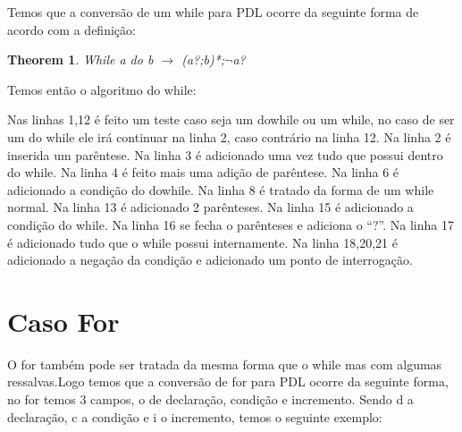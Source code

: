 \documentclass{article}
\newtheorem{theorem}{Theorem}
\begin{document}
		Temos que a conversão de um while para PDL ocorre da seguinte forma de acordo com a definição:
		
			\begin{theorem}
			While a do b $\rightarrow$ (a?;b)*;$\neg$a?
			\end{theorem}
		
		Temos então o algoritmo do while:
		
		\begin{algorithm}
		\end{algorithm}
	
		Nas linhas 1,12 é feito um teste caso seja um dowhile ou um while, no caso de ser um do while ele irá continuar na linha 2, caso contrário na linha 12.
		Na linha 2 é inserida um parêntese.
		Na linha 3 é adicionado uma vez tudo que possui dentro do while.
		Na linha 4 é feito mais uma adição de parêntese.
		Na linha 6 é adicionado a condição do dowhile.
		Na linha 8 é tratado da forma de um while normal.
		Na linha 13 é adicionado 2 parênteses.
		Na linha 15 é adicionado a condição do while.
		Na linha 16 se fecha o parênteses e adiciona o “?”.
		Na linha 17 é adicionado tudo que o while possui internamente.
		Na linha 18,20,21 é adicionado a negação da condição e adicionado um ponto de interrogação.
		
		\section{Caso For}
		
		O for também pode ser tratada da mesma forma que o while mas com algumas ressalvas.Logo temos que a conversão de for para PDL ocorre da seguinte forma, no for temos 3 campos, o de declaração, condição e incremento. Sendo d a declaração, c a condição e i o incremento, temos o seguinte exemplo:
		
		\begin{algorithm}
			\For{c}{
				E\;
			}
		\end{algorithm}
		
\end{document}
